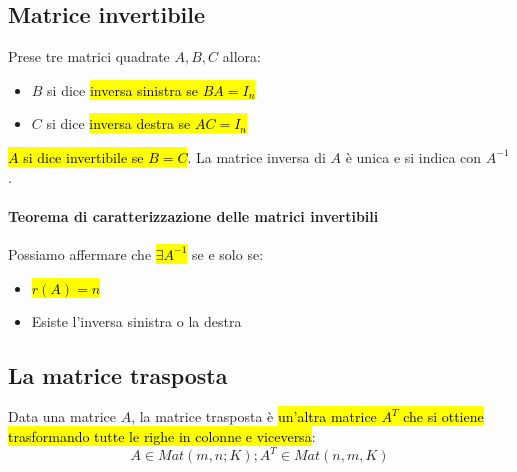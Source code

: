 \documentclass[a4paper,12pt,oneside]{article}
\begin{document}
\subsection{Matrice invertibile}
Prese tre matrici quadrate $A, B, C$ allora:
\begin{itemize}
    \item $B$ si dice \hl{inversa sinistra se $BA = I_{n}$}
    \item $C$ si dice \hl{inversa destra se $AC = I_{n}$}
\end{itemize}
\hl{$A$ si dice invertibile se $B = C$}. La matrice inversa di $A$ è unica e
si indica con $A^{-1}$.

\paragraph{Teorema di caratterizzazione delle matrici invertibili} Possiamo
affermare che \hl{$\exists A^{-1}$} se e solo se:
\begin{itemize}
    \item \hl{$r(A) = n$}
    \item Esiste l'inversa sinistra o la destra
\end{itemize}

\subsection{La matrice trasposta}
Data una matrice $A$, la matrice trasposta è \hl{un'altra matrice $A^T$ che si
ottiene trasformando tutte le righe in colonne e viceversa}:
\[
    A \in Mat(m,n;K); A^T \in Mat(n,m,K)
\]
\end{document}
